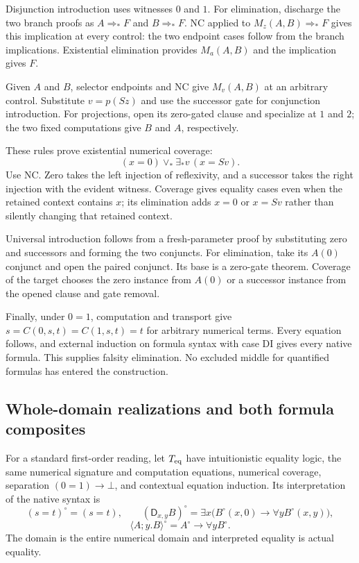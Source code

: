 \documentclass[11pt]{article}
\theoremstyle{definition}\newtheorem{definition}[theorem]{Definition}
\begin{document}
Disjunction introduction uses witnesses $0$ and $1$.
For elimination, discharge the two branch proofs as
$A\Rightarrow_*F$ and $B\Rightarrow_*F$. NC applied to
$M_z(A,B)\Rightarrow_*F$ gives this implication at every
control: the two endpoint cases follow from the branch
implications. Existential elimination provides $M_a(A,B)$
and the implication gives $F$.

Given $A$ and $B$, selector endpoints and NC give $M_v(A,B)$
at an arbitrary control. Substitute $v=p(Sz)$ and use the
successor gate for conjunction introduction. For projections,
open its zero-gated clause and specialize at $1$ and $2$;
the two fixed computations give $B$ and $A$, respectively.

These rules prove existential numerical coverage:
\[
     (x=0)\vee_*\exists_*v\,(x=Sv).
\tag{Coverage}\label{eq:choice-coverage}
\]
Use NC. Zero takes the left injection of reflexivity, and a
successor takes the right injection with the evident witness.
Coverage gives equality cases even when the retained context
contains $x$; its elimination adds $x=0$ or $x=Sv$ rather
than silently changing that retained context.

Universal introduction follows from a fresh-parameter proof
by substituting zero and successors and forming the two
conjuncts. For elimination, take its $A(0)$ conjunct and
open the paired conjunct. Its base is a zero-gate theorem.
Coverage of the target chooses the zero instance from
$A(0)$ or a successor instance from the opened clause
and gate removal.

Finally, under $0=1$, computation and transport give
$s=C(0,s,t)=C(1,s,t)=t$ for arbitrary numerical terms.
Every equation follows, and external induction on formula
syntax with case DI gives every native formula. This
supplies falsity elimination. No excluded middle for
quantified formulas has entered the construction.

\subsection{Whole-domain realizations and both formula composites}

For a standard first-order reading, let $T_{\rm eq}$ have
intuitionistic equality logic, the same numerical signature
and computation equations, numerical coverage, separation
$(0=1)\to\bot$, and contextual equation induction.
Its interpretation of the native syntax is
\[
 (s=t)^\circ=(s=t),\qquad
 (\mathsf D_{x,y}B)^\circ
   =\exists x\bigl(B^\circ(x,0)\to\forall y B^\circ(x,y)\bigr),
\]
\[
 \langle A;y.B\rangle^\circ
       =A^\circ\to\forall y B^\circ.
\]
The domain is the entire numerical domain and interpreted
equality is actual equality.
\end{document}
